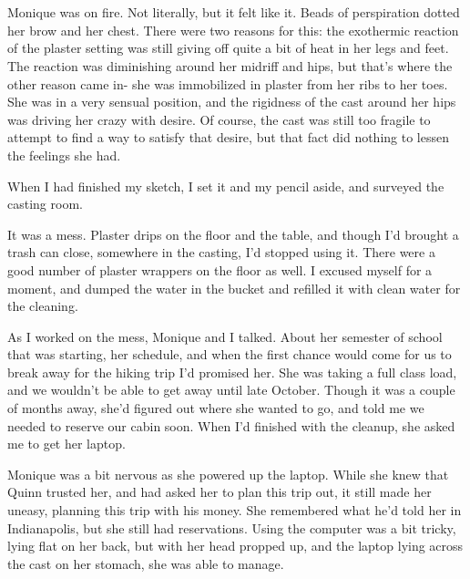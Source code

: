 \chapter{}
\begin{thought}
Monique was on fire. Not literally, but it felt like it. Beads of perspiration dotted her
brow and her chest. There were two reasons for this: the exothermic reaction of the plaster
setting was still giving off quite a bit of heat in her legs and feet. The reaction was
diminishing around her midriff and hips, but that's where the other reason came in- she was
immobilized in plaster from her ribs to her toes. She was in a very sensual position, and the
rigidness of the cast around her hips was driving her crazy with desire. Of course, the cast was
still too fragile to attempt to find a way to satisfy that desire, but that fact did nothing to
lessen the feelings she had.
\end{thought}

When I had finished my sketch, I set it and my pencil aside, and surveyed the casting room.

It was a mess. Plaster drips on the floor and the table, and though I'd brought a trash can
close, somewhere in the casting, I'd stopped using it. There were a good number of plaster
wrappers on the floor as well. I excused myself for a moment, and dumped the water in the bucket
and refilled it with clean water for the cleaning.

As I worked on the mess, Monique and I talked. About her semester of school that was
starting, her schedule, and when the first chance would come for us to break away for the hiking
trip I'd promised her. She was taking a full class load, and we wouldn't be able to get away
until late October. Though it was a couple of months away, she'd figured out where she wanted to
go, and told me we needed to reserve our cabin soon. When I'd finished with the cleanup, she
asked me to get her laptop.

\begin{thought}
Monique was a bit nervous as she powered up the laptop. While she knew that Quinn trusted
her, and had asked her to plan this trip out, it still made her uneasy, planning this trip with
his money. She remembered what he'd told her in Indianapolis, but she still had reservations.
Using the computer was a bit tricky, lying flat on her back, but with her head propped up, and
the laptop lying across the cast on her stomach, she was able to manage.
\end{thought}

